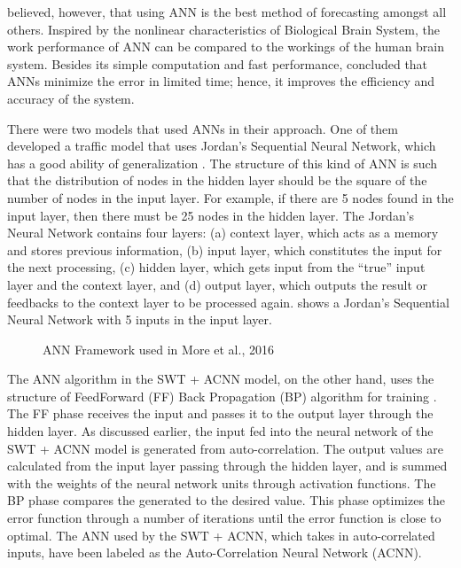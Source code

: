  believed, however, that using ANN is the best method of forecasting amongst all others. Inspired by the nonlinear characteristics of Biological Brain System, the work performance of ANN can be compared to the workings of the human brain system. Besides its simple computation and fast performance,  concluded that ANNs minimize the error in limited time; hence, it improves the efficiency and accuracy of the system. 

There were two models that used ANNs in their approach. One of them developed a traffic model that uses Jordan’s Sequential Neural Network, which has a good ability of generalization . The structure of this kind of ANN is such that the distribution of nodes in the hidden layer should be the square of the number of nodes in the input layer. For example, if there are 5 nodes found in the input layer, then there must be 25 nodes in the hidden layer. The Jordan’s Neural Network contains four layers: (a) context layer, which acts as a memory and stores previous information, (b) input layer, which constitutes the input for the next processing, (c) hidden layer, which gets input from the “true” input layer and the context layer, and (d) output layer, which outputs the result or feedbacks to the context layer to be processed again.  shows a Jordan’s Sequential Neural Network with 5 inputs in the input layer.

\begin{figure}[!t]
	\centering
	\captionsetup{justification=centering}
	\caption{ANN Framework used in More et al., 2016}
	\label{fig:annJordan}
\end{figure}

The ANN algorithm in the SWT + ACNN model, on the other hand, uses the structure of FeedForward (FF) Back Propagation (BP) algorithm for training . The FF phase receives the input and passes it to the output layer through the hidden layer. As discussed earlier, the input fed into the neural network of the SWT + ACNN model is generated from auto-correlation. The output values are calculated from the input layer passing through the hidden layer, and is summed with the weights of the neural network units through activation functions. The BP phase compares the generated to the desired value. This phase optimizes the error function through a number of iterations until the error function is close to optimal. The ANN used by the SWT + ACNN, which takes in auto-correlated inputs, have been labeled as the Auto-Correlation Neural Network (ACNN).

